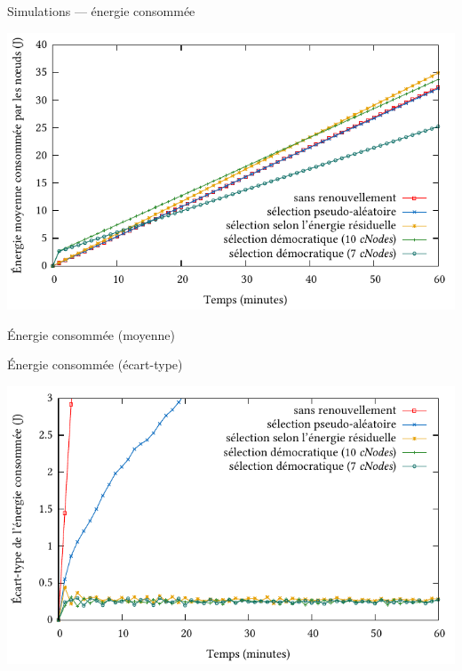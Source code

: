 \documentclass[aspectratio=43]{beamer} %
\begin{document}
\begin{frame}{Simulations --- énergie consommée}
  \begin{minipage}{.65\textwidth}
    \includegraphics[height=.48\textheight]{Figs/plot_sd_consumptionXtime.pdf}
  \end{minipage}
  \begin{minipage}[c][.48\textheight][t]{.34\textwidth}
    \raggedright\medskip
    Énergie consommée (moyenne)
  \end{minipage}
  \begin{minipage}[c][.48\textheight][b]{.34\textwidth}
    \raggedright
    Énergie consommée (écart-type)
    \bigskip
  \end{minipage}
  \begin{minipage}{.65\textwidth}
    \raggedleft
    \includegraphics[height=.48\textheight]{Figs/plot_sd_stddevXtime.pdf}
  \end{minipage}
\end{frame}
\end{document}
